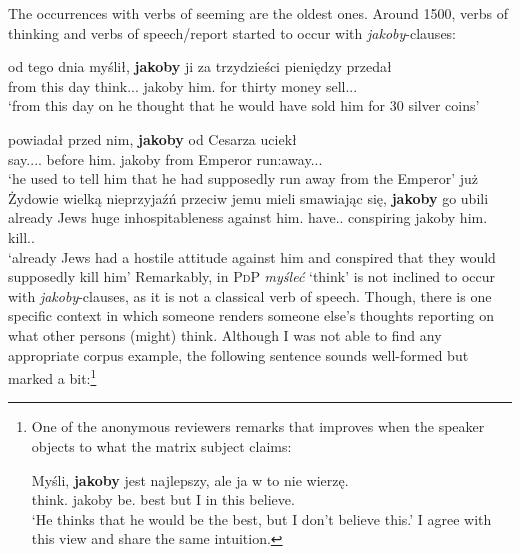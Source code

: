 \documentclass[output=paper
,modfonts
,nonflat]{langsci/langscibook}
\begin{document}
\noindent The occurrences with verbs of seeming are the oldest ones. Around 1500, verbs of thinking and verbs of speech\slash report started to occur with \emph{jakoby}-clauses:

\ea \gll od tego dnia myślił, \textbf{jakoby} ji za trzydzieści pieniędzy przedał \\
		from this day think.{\lptcp}.{\sg}.{\masc} jakoby him.{\acc} for thirty money sell.{\lptcp}.{\sg}.{\masc} \\
\glt	`from this day on he thought that he would have sold him for 30 silver coins' 
\z

\ea \ea \gll	powiadał przed nim, \textbf{jakoby} od Cesarza uciekł \\
		say.{\lptcp}.{\sg}.{\masc}.{\hab} before him.{\dat} jakoby from Emperor run:away.{\lptcp}.{\sg}.{\masc} \label{op_1} \\
	\glt	`he used to tell him that he had supposedly run away from the Emperor'  
	\ex\gll		  już Żydowie wielką nieprzyjaźń przeciw jemu mieli smawiając się, \textbf{jakoby} go ubili \label{op_2} \\
            already Jews huge inhospitableness against him.{\dat} have.{\lptcp}.{\vir} conspiring {} jakoby him.{\acc} kill.{\lptcp}.{\vir} \\
	\glt	`already Jews had a hostile attitude against him and conspired that they would supposedly kill him'         
    \z\z		
Remarkably, in \textsc{PdP} \emph{myśleć} `think' is not inclined to occur with \emph{jakoby}-clauses, as it is not a classical verb of speech. Though, there is one specific context in which someone renders someone else's thoughts reporting on what other persons (might) think. Although I was not able to find any appropriate corpus example, the following sentence sounds well-formed but marked a bit:\footnote{One of the anonymous reviewers remarks that  improves when the speaker objects to what the matrix subject claims:

\ea \gll Myśli, \textbf{jakoby} jest najlepszy, ale ja w to nie wierzę. \\
		think.{\thirdperson}{\sg} jakoby be.{\thirdperson}{\sg} best but I in this {\negation} believe.{\firstperson}{\sg} \\
\glt	 `He thinks that he would be the best, but I don't believe this.'
\z
I agree with this view and share the same intuition.
} 
\end{document}
